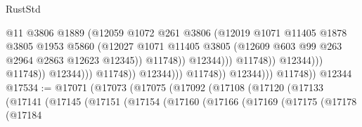 \begin{lexlean}{RustStd}
\begin{coremodule}
{\begin{coremodule}
{{{{{{{{{{{{{{{{{{{{{{{{{{{{{                                                      @11
                                                      @3806
                                                      @1889
                                                      (@12059
                                                        @1072
                                                        @261
                                                        @3806
                                                        (@12019
                                                          @1071
                                                          @11405
                                                          @1878
                                                          @3805
                                                          @1953
                                                          @5860
                                                          (@12027
                                                            @1071
                                                            @11405
                                                            @3805
                                                            (@12609
                                                              @603
                                                              @99
                                                              @263
                                                              @2964
                                                              @2863
                                                              @12623
                                                              @12345))
                                                          @11748))
                                                      @12344)))
                                                @11748))
                                            @12344)))
                                      @11748))
                                  @12344)))
                            @11748))
                        @12344)))
                  @11748))
              @12344)))
        @11748))
    @12344
@17534 := @17071
    (@17073
      (@17075
        (@17092
          (@17108
            (@17120
              (@17133
                (@17141
                  (@17145
                    (@17151
                      (@17154
                        (@17160
                          (@17166
                            (@17169
                              (@17175
                                (@17178
                                  (@17184
}}}}}}}}}}}}}}}}}}}}}}}}}}}}}
\end{coremodule}}
\end{coremodule}
\end{lexlean}
